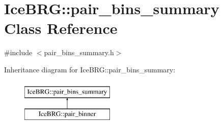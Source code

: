\hypertarget{classIceBRG_1_1pair__bins__summary}{\section{Ice\-B\-R\-G\-:\-:pair\-\_\-bins\-\_\-summary Class Reference}
\label{classIceBRG_1_1pair__bins__summary}
}


{\ttfamily \#include $<$pair\-\_\-bins\-\_\-summary.\-h$>$}

Inheritance diagram for Ice\-B\-R\-G\-:\-:pair\-\_\-bins\-\_\-summary\-:\begin{figure}[H]
\begin{center}
\leavevmode
\includegraphics[height=2.000000cm]{classIceBRG_1_1pair__bins__summary}
\end{center}
\end{figure}
